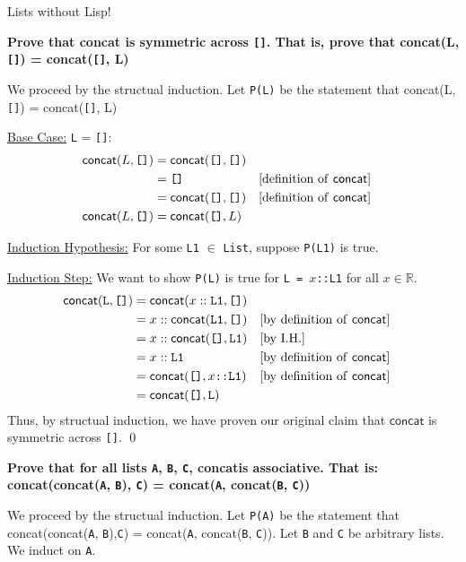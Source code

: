\documentclass[11pt, nopagenumbers]{adamblan-hw}
\newcommand{\RR}{\mathbb{R}}
\newcommand{\fconcat}{\textsf{concat}}
\newcommand{\emptylist}{\texttt{[]}}
\newcommand{\T}[1]{\texttt{#1}}
\newcommand{\List}{\texttt{List}}
\begin{document}
\begin{question}{\color{red} Lists without Lisp!}
\begin{part}
\textbf{Prove that concat is symmetric across \emptylist. That is, prove that \fconcat(L, \emptylist) = \fconcat(\emptylist, L)}

We proceed by the structual induction. Let \T{P(L)} be the statement that \fconcat(L, \emptylist) = \fconcat(\emptylist, L)

\underline{Base Case:} \T{L} = \emptylist: 
\begin{align*}
\fconcat(L, \emptylist) &= \fconcat(\emptylist, \emptylist) \\
&= \emptylist && \text{[definition of \fconcat]} \\
&= \fconcat(\emptylist, \emptylist) && \text{[definition of \fconcat]}\\
\fconcat(L, \emptylist) &= \fconcat(\emptylist, L) \\
\end{align*}

\underline{Induction Hypothesis:} For some \T{L1} $\in$ \List, suppose \T{P(L1)} is true.

\underline{Induction Step:} We want to show \T{P(L)} is true for \T{L = $x$::L1} for all $x \in \RR$.
\begin{align*}
\fconcat(\T{L}, \emptylist) &= \fconcat(\T{$x$}::\T{L1}, \emptylist) \\
&= \T{$x$}::\fconcat(\T{L1}, \emptylist) && \text{[by definition of \fconcat]} \\
&= \T{$x$}::\fconcat(\emptylist, \T{L1}) && \text{[by I.H.]} \\
&= \T{$x$}::\T{L1} && \text{[by definition of \fconcat]} \\
&= \fconcat(\emptylist, \T{$x$::L1}) && \text{[by definition of \fconcat]} \\
&= \fconcat(\emptylist, \T{L})
\end{align*}
Thus, by structual induction, we have proven our original claim that $\fconcat$  is symmetric across \emptylist. \qed
\end{part}

\pagebreak
\begin{part} \textbf{Prove that for all lists \T{A}, \T{B}, \T{C}, \fconcat is associative. That is:
    \\\fconcat(\fconcat(\T{A}, \T{B}), \T{C}) = \fconcat(\T{A}, \fconcat(\T{B}, \T{C}))}

We proceed by the structual induction. Let \T{P(A)} be the statement that \fconcat(\fconcat(\T{A}, \T{B}),\T{C}) = \fconcat(\T{A}, \fconcat(\T{B}, \T{C})).
Let \T{B} and \T{C} be arbitrary lists. We induct on \T{A}.


\end{part}
\end{question}
\end{document}
